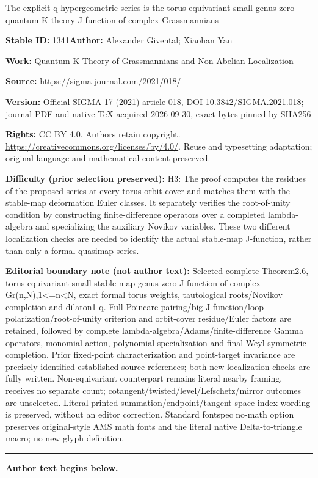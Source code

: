 \documentclass[11pt]{article}
\numberwithin{equation}{section}
\numberwithin{equation}{section}
\begin{document}
\begin{center}\Large The explicit q-hypergeometric series is the torus-equivariant small genus-zero quantum K-theory J-function of complex Grassmannians\end{center}
\noindent\textbf{Stable ID:} 1341\quad\textbf{Author:} Alexander Givental; Xiaohan Yan\par
\noindent\textbf{Work:} Quantum K-Theory of Grassmannians and Non-Abelian Localization\par
\noindent\textbf{Source:} \url{https://sigma-journal.com/2021/018/}\par
\noindent\textbf{Version:} Official SIGMA 17 (2021) article 018, DOI 10.3842/SIGMA.2021.018; journal PDF and native TeX acquired 2026-09-30, exact bytes pinned by SHA256\par
\noindent\textbf{Rights:} CC BY 4.0. Authors retain copyright. \url{https://creativecommons.org/licenses/by/4.0/}. Reuse and typesetting adaptation; original language and mathematical content preserved.\par
\noindent\textbf{Difficulty (prior selection preserved):} {\CJKfont H3: The proof computes the residues of the proposed series at every torus-orbit cover and matches them with the stable-map deformation Euler classes. It separately verifies the root-of-unity condition by constructing finite-difference operators over a completed lambda-algebra and specializing the auxiliary Novikov variables. These two different localization checks are needed to identify the actual stable-map J-function, rather than only a formal quasimap series.}\par
\medskip\noindent\textbf{Editorial boundary note (not author text):} Selected complete Theorem2.6, torus-equivariant small stable-map genus-zero J-function of complex Gr(n,N),1<=n<N, exact formal torus weights, tautological roots/Novikov completion and dilaton1-q. Full Poincare pairing/big J-function/loop polarization/root-of-unity criterion and orbit-cover residue/Euler factors are retained, followed by complete lambda-algebra/Adams/finite-difference Gamma operators, monomial action, polynomial specialization and final Weyl-symmetric completion. Prior fixed-point characterization and point-target invariance are precisely identified established source references; both new localization checks are fully written. Non-equivariant counterpart remains literal nearby framing, receives no separate count; cotangent/twisted/level/Lefschetz/mirror outcomes are unselected. Literal printed summation/endpoint/tangent-space index wording is preserved, without an editor correction. Standard fontspec no-math option preserves original-style AMS math fonts and the literal native Delta-to-triangle macro; no new glyph definition.\par
\medskip\hrule\medskip\noindent\textbf{Author text begins below.}\par
\end{document}
